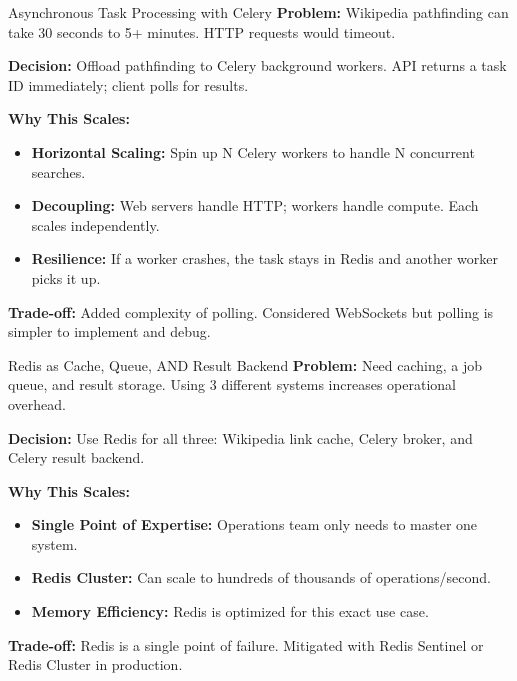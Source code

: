 \documentclass[11pt,a4paper]{article}
\begin{document}
\begin{decisionbox}{Asynchronous Task Processing with Celery}
\textbf{Problem:} Wikipedia pathfinding can take 30 seconds to 5+ minutes. HTTP requests would timeout.

\textbf{Decision:} Offload pathfinding to Celery background workers. API returns a task ID immediately; client polls for results.

\textbf{Why This Scales:}
\begin{itemize}[leftmargin=*, nosep]
    \item \textbf{Horizontal Scaling:} Spin up N Celery workers to handle N concurrent searches.
    \item \textbf{Decoupling:} Web servers handle HTTP; workers handle compute. Each scales independently.
    \item \textbf{Resilience:} If a worker crashes, the task stays in Redis and another worker picks it up.
\end{itemize}

\textbf{Trade-off:} Added complexity of polling. Considered WebSockets but polling is simpler to implement and debug.
\end{decisionbox}

\begin{decisionbox}{Redis as Cache, Queue, AND Result Backend}
\textbf{Problem:} Need caching, a job queue, and result storage. Using 3 different systems increases operational overhead.

\textbf{Decision:} Use Redis for all three: Wikipedia link cache, Celery broker, and Celery result backend.

\textbf{Why This Scales:}
\begin{itemize}[leftmargin=*, nosep]
    \item \textbf{Single Point of Expertise:} Operations team only needs to master one system.
    \item \textbf{Redis Cluster:} Can scale to hundreds of thousands of operations/second.
    \item \textbf{Memory Efficiency:} Redis is optimized for this exact use case.
\end{itemize}

\textbf{Trade-off:} Redis is a single point of failure. Mitigated with Redis Sentinel or Redis Cluster in production.
\end{decisionbox}
\end{document}
